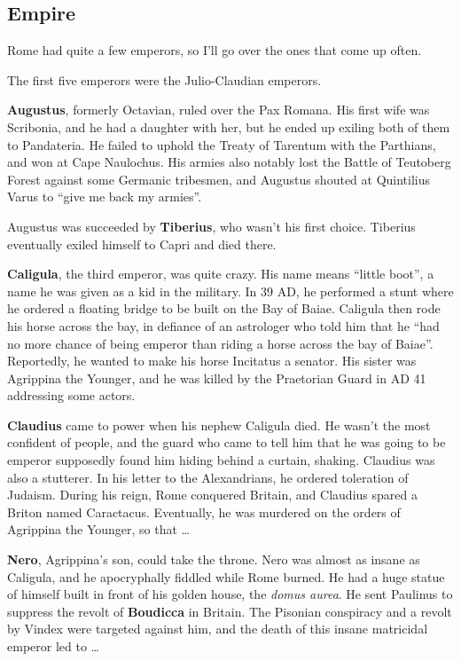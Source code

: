 \subsection*{Empire}

Rome had quite a few emperors, so I'll go over the ones that come up often.

The first five emperors were the Julio-Claudian emperors.

\textbf{Augustus}, formerly Octavian, ruled over the Pax Romana.
His first wife was Scribonia, and he had a daughter with her,
but he ended up exiling both of them to Pandateria.
He failed to uphold the Treaty of Tarentum with the Parthians, and won at Cape Naulochus.
His armies also notably lost the Battle of Teutoberg Forest against some Germanic tribesmen,
and Augustus shouted at Quintilius Varus to ``give me back my armies''.

Augustus was succeeded by \textbf{Tiberius}, who wasn't his first choice.
Tiberius eventually exiled himself to Capri and died there.

\textbf{Caligula}, the third emperor, was quite crazy.
His name means ``little boot'', a name he was given as a kid in the military.
In 39 AD, he performed a stunt where he ordered a floating bridge to be built on the Bay of Baiae.
Caligula then rode his horse across the bay, in defiance of an astrologer who told him that he
``had no more chance of being emperor than riding a horse across the bay of Baiae''.
Reportedly, he wanted to make his horse Incitatus a senator.
His sister was Agrippina the Younger, and he was killed by the Praetorian Guard in AD 41 addressing some actors.

\textbf{Claudius} came to power when his nephew Caligula died.
He wasn't the most confident of people, and the guard who came to tell
him that he was going to be emperor supposedly found him hiding behind a curtain, shaking.
Claudius was also a stutterer.
In his letter to the Alexandrians, he ordered toleration of Judaism.
During his reign, Rome conquered Britain, and Claudius spared a Briton named Caractacus.
Eventually, he was murdered on the orders of Agrippina the Younger, so that \ldots

\textbf{Nero}, Agrippina's son, could take the throne.
Nero was almost as insane as Caligula, and he apocryphally fiddled while Rome burned.
He had a huge statue of himself built in front of his golden house, the \textit{domus aurea}.
He sent Paulinus to suppress the revolt of \textbf{Boudicca} in Britain.
The Pisonian conspiracy and a revolt by Vindex were targeted against him,
and the death of this insane matricidal emperor led to \ldots


